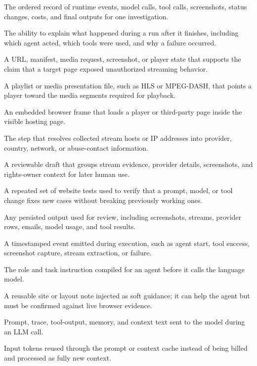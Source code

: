 \begin{description}[leftmargin=4.55cm,labelwidth=4.15cm,labelsep=0.4cm,style=sameline,itemsep=0.34em,topsep=0.35em,parsep=0pt]
  \item[Trace] The ordered record of runtime events, model calls, tool calls, screenshots, status changes, costs, and final outputs for one investigation.
  \item[Observability] The ability to explain what happened during a run after it finishes, including which agent acted, which tools were used, and why a failure occurred.
  \item[Stream evidence] A URL, manifest, media request, screenshot, or player state that supports the claim that a target page exposed unauthorized streaming behavior.
  \item[Manifest] A playlist or media presentation file, such as HLS or MPEG-DASH, that points a player toward the media segments required for playback.
  \item[Iframe] An embedded browser frame that loads a player or third-party page inside the visible hosting page.
  \item[Provider enrichment] The step that resolves collected stream hosts or IP addresses into provider, country, network, or abuse-contact information.
  \item[Takedown email] A reviewable draft that groups stream evidence, provider details, screenshots, and rights-owner context for later human use.
  \item[Regression batch] A repeated set of website tests used to verify that a prompt, model, or tool change fixes new cases without breaking previously working ones.
  \item[Evidence artifact] Any persisted output used for review, including screenshots, streams, provider rows, emails, model usage, and tool results.
  \item[Runtime event] A timestamped event emitted during execution, such as agent start, tool success, screenshot capture, stream extraction, or failure.
  \item[Prompt] The role and task instruction compiled for an agent before it calls the language model.
  \item[Memory hint] A reusable site or layout note injected as soft guidance; it can help the agent but must be confirmed against live browser evidence.
  \item[Input tokens] Prompt, trace, tool-output, memory, and context text sent to the model during an LLM call.
  \item[Cached input tokens] Input tokens reused through the prompt or context cache instead of being billed and processed as fully new context.

\end{description}
